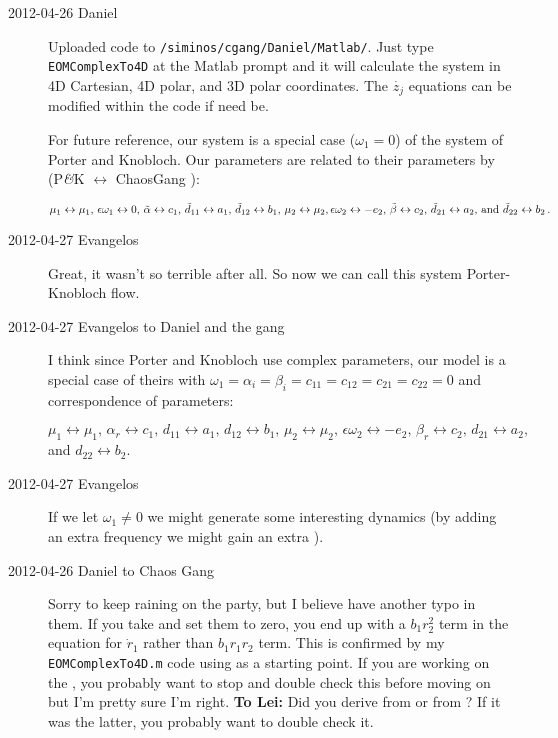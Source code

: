 \begin{description}
\item[2012-04-26 Daniel] Uploaded code to
\texttt{/siminos/cgang/Daniel/Matlab/}. Just type \texttt{EOMComplexTo4D}
at the Matlab prompt and it will calculate the system in 4D Cartesian, 4D
polar, and 3D polar coordinates. The $\dot{z_j}$ equations can be
modified within the code if need be.

For future reference, our {\twoMode} system  is a
special case ($\omega_1 = 0$) of the system of Porter and
Knobloch. Our parameters are related to their parameters by
(P\textit{\&}K $\leftrightarrow$ ChaosGang {\twoMode}):

\(
  \mu_1 \leftrightarrow \mu_1,\, \epsilon \omega_1 \leftrightarrow 0,\,
  \tilde{\alpha} \leftrightarrow c_1,\, \tilde{d}_{11} \leftrightarrow a_1,\,
  \tilde{d}_{12} \leftrightarrow b_1,\, \mu_2 \leftrightarrow \mu_2,\,
  \\
  \epsilon \omega_2 \leftrightarrow -e_2,\, \tilde{\beta} \leftrightarrow c_2,\,
  \tilde{d}_{21} \leftrightarrow a_2,$ and  $\tilde{d}_{22} \leftrightarrow b_2
\,.
\)

\item[2012-04-27 Evangelos] Great, it wasn't so terrible after all. So
now we can call this system Porter-Knobloch flow.

\item[2012-04-27 Evangelos to Daniel and the gang]
I think since Porter and Knobloch  use complex parameters,
our model is a special case of theirs with
$\omega_1=\alpha_i =\beta_i=c_{11}=c_{12}=c_{21}=c_{22} = 0$
and correspondence of parameters:

 $\mu_1 \leftrightarrow \mu_1,\, \alpha_r \leftrightarrow c_1,\, d_{11} \leftrightarrow a_1,\, d_{12} \leftrightarrow b_1,\, \mu_2 \leftrightarrow \mu_2,\, \epsilon \omega_2 \leftrightarrow -e_2,\, \beta_r \leftrightarrow c_2,\, d_{21} \leftrightarrow a_2,$ and  $d_{22} \leftrightarrow b_2$.

\item[2012-04-27 Evangelos] If we let $\omega_1\neq0$ we might generate
some interesting dynamics (by adding an extra frequency we might gain an
extra \reqv).

\item[2012-04-26 Daniel to Chaos Gang] Sorry to keep raining on the
party, but I believe  have another typo in
them. If you take  and set them to zero, you end
up with a $b_1 r_2^2$ term in the equation for $\dot{r}_1$ rather than
$b_1 r_1 r_2$ term. This is confirmed by my \texttt{EOMComplexTo4D.m}
code using  as a starting point. If you are
working on the {\twoMode} \reqva, you probably want to stop and
double check this before moving on but I'm pretty sure I'm right. {\bf To
Lei:} Did you derive  from 
or from ? If it was the latter, you probably
want to double check it.


\end{description}
